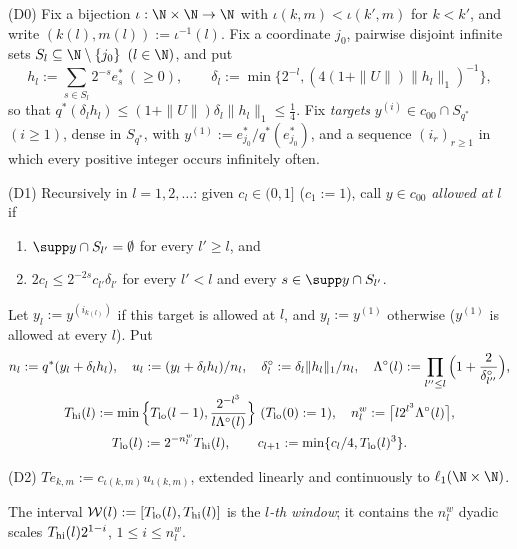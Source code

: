 \begin{definition}\label{def:SLD}
\textup{(D0)} Fix a bijection $\iota:\N\times\N\to\N$ with
$\iota(k,m)<\iota(k',m)$ for $k<k'$, and write $(k(l),m(l)):=\iota^{-1}(l)$.
Fix a coordinate $j_0$, pairwise disjoint infinite sets
$S_l\subseteq\N\setminus\{j_0\}$ $(l\in\N)$, and put
\[
 h_l:=\sum_{s\in S_l}2^{-s}e_s^*\ (\ge0),\qquad \delta_l:=\min\big\{2^{-l},
 (4(1+\|U\|)\|h_l\|_1)^{-1}\big\},
\]
so that $q^*(\delta_lh_l)\le(1+\|U\|)\delta_l\|h_l\|_1\le\frac14$.  Fix
\emph{targets} $y^{(i)}\in c_{00}\cap S_{q^*}$ $(i\ge1)$, dense in
$S_{q^*}$, with $y^{(1)}:=e_{j_0}^*/q^*(e_{j_0}^*)$, and a sequence
$(i_r)_{r\ge1}$ in which every positive integer occurs infinitely often.

\textup{(D1)} Recursively in $l=1,2,\dots$: given $c_l\in(0,1]$ ($c_1:=1$),
call $y\in c_{00}$ \emph{allowed at} $l$ if
\begin{enumerate}
\item[(a)] $\supp y\cap S_{l'}=\emptyset$ for every $l'\ge l$, and
\item[(b)] $2c_l\le2^{-2s}c_{l'}\delta_{l'}$ for every $l'<l$ and every
$s\in\supp y\cap S_{l'}$.
\end{enumerate}
Let $y_l:=y^{(i_{k(l)})}$ if this target is allowed at $l$, and
$y_l:=y^{(1)}$ otherwise ($y^{(1)}$ is allowed at every $l$).  Put
\begin{gather*}
 n_l:=q^*(y_l+\delta_lh_l),\quad u_l:=(y_l+\delta_lh_l)/n_l,\quad
 \delta^\circ_l:=\delta_l\|h_l\|_1/n_l,\quad
 \Lambda^\circ(l):=\prod_{l''\le l}\Big(1+\frac2{\delta^\circ_{l''}}\Big),\\
 T_{\rm hi}(l):=\min\Big\{T_{\rm lo}(l-1),\frac{2^{-l^3}}{l\Lambda^\circ(l)}
 \Big\}\ (T_{\rm lo}(0):=1),\quad n^w_l:=\big\lceil l2^{l^3}\Lambda^\circ(l)
 \big\rceil,\\
 T_{\rm lo}(l):=2^{-n^w_l}T_{\rm hi}(l),\qquad
 c_{l+1}:=\min\{c_l/4,T_{\rm lo}(l)^3\}.
\end{gather*}

\textup{(D2)} $Te_{k,m}:=c_{\iota(k,m)}u_{\iota(k,m)}$, extended linearly and
continuously to $\ell_1(\N\times\N)$.
\end{definition}

The interval $\mathcal W(l):=[T_{\rm lo}(l),T_{\rm hi}(l)]$ is the
\emph{$l$-th window}; it contains the $n^w_l$ dyadic scales
$T_{\rm hi}(l)2^{1-i}$, $1\le i\le n^w_l$.

